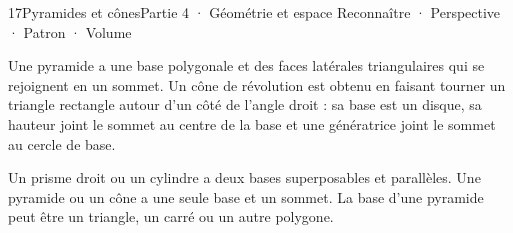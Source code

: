 \begin{ouverture}[espace]{17}{Pyramides et cônes}{Partie 4 · Géométrie et espace}
{Reconnaître · Perspective · Patron · Volume}
\end{ouverture}
\pagestyle{otMain}\essentiel\fontsize{11}{15}\selectfont
{}\label{cours-17-1}
\begin{definition}Une pyramide a une base polygonale et des faces latérales triangulaires qui se rejoignent en un sommet. Un cône de révolution est obtenu en faisant tourner un triangle rectangle autour d’un côté de l’angle droit : sa base est un disque, sa hauteur joint le sommet au centre de la base et une génératrice joint le sommet au cercle de base.\end{definition}
\begin{savoirfaire}Un prisme droit ou un cylindre a deux bases superposables et parallèles. Une pyramide ou un cône a une seule base et un sommet. La base d’une pyramide peut être un triangle, un carré ou un autre polygone.\end{savoirfaire}
\label{fig-cours-17-1-cours-solides}

